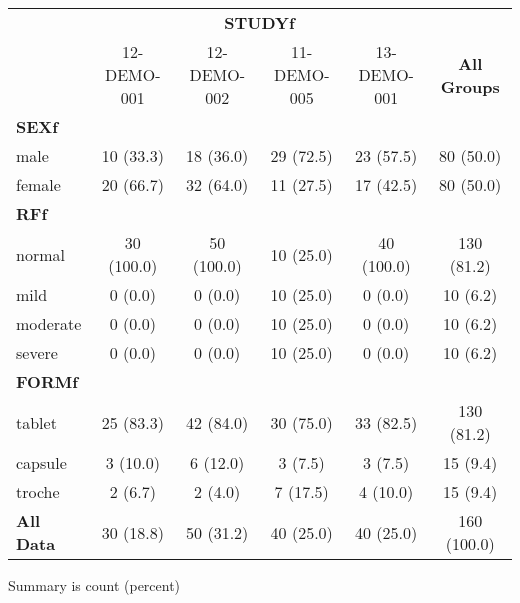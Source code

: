{\def\arraystretch{1.4}\tabcolsep=5pt
\begin{threeparttable}
\begin{tabular}[h]{lccccc}
\hline
\multicolumn{1}{c}{} & \multicolumn{4}{c}{\textbf{STUDYf}} & \multicolumn{1}{c}{}\\
\cmidrule(lr){2-5}
\ & 12-DEMO-001 & 12-DEMO-002 & 11-DEMO-005 & 13-DEMO-001 & \textbf{All Groups} \\
\hline
\multicolumn{6}{l}{\textbf{SEXf}}\\
male & 10 (33.3) & 18 (36.0) & 29 (72.5) & 23 (57.5) & 80 (50.0) \\
female & 20 (66.7) & 32 (64.0) & 11 (27.5) & 17 (42.5) & 80 (50.0) \\
\hline \multicolumn{6}{l}{\textbf{RFf}}\\
normal & 30 (100.0) & 50 (100.0) & 10 (25.0) & 40 (100.0) & 130 (81.2) \\
mild & 0 (0.0) & 0 (0.0) & 10 (25.0) & 0 (0.0) & 10 (6.2) \\
moderate & 0 (0.0) & 0 (0.0) & 10 (25.0) & 0 (0.0) & 10 (6.2) \\
severe & 0 (0.0) & 0 (0.0) & 10 (25.0) & 0 (0.0) & 10 (6.2) \\
\hline \multicolumn{6}{l}{\textbf{FORMf}}\\
tablet & 25 (83.3) & 42 (84.0) & 30 (75.0) & 33 (82.5) & 130 (81.2) \\
capsule & 3 (10.0) & 6 (12.0) & 3 (7.5) & 3 (7.5) & 15 (9.4) \\
troche & 2 (6.7) & 2 (4.0) & 7 (17.5) & 4 (10.0) & 15 (9.4) \\ \hline \hline
\textbf{All Data} & 30 (18.8) & 50 (31.2) & 40 (25.0) & 40 (25.0) & 160 (100.0) \\
\hline
\end{tabular}
\begin{tablenotes}[flushleft]
\item Summary is count (percent)
\end{tablenotes}
\end{threeparttable}
}
